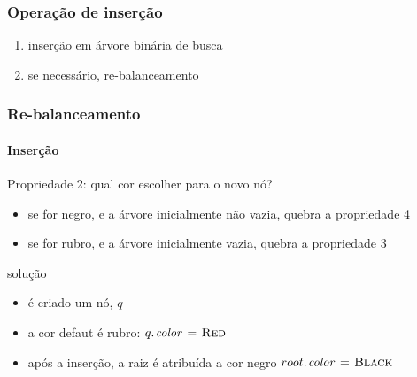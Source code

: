 \documentclass{beamer}
\begin{document}
\begin{frame}

\frametitle{Operação de inserção}

\begin{enumerate}

\item inserção em árvore binária de busca

\item \alert{se necessário}, re-balanceamento

\end{enumerate}

\end{frame}

\begin{frame}

\frametitle{Re-balanceamento}
\framesubtitle{Inserção}

Propriedade 2: qual cor escolher para o novo nó?

\begin{itemize}

\item se for negro, e a árvore inicialmente não vazia, quebra a propriedade 4

\item se for rubro, e a árvore inicialmente vazia, quebra a propriedade 3

\end{itemize}

\pause
\alert{solução}

\begin{itemize}

\item é criado um nó, $q$

\item a cor defaut é rubro: $\attrib{q}{color} \gets \const{Red}$

\item após a inserção, a raiz é atribuída a cor negro
$\attrib{root}{color} \gets \const{Black}$

\end{itemize}

\end{frame}
\end{document}
